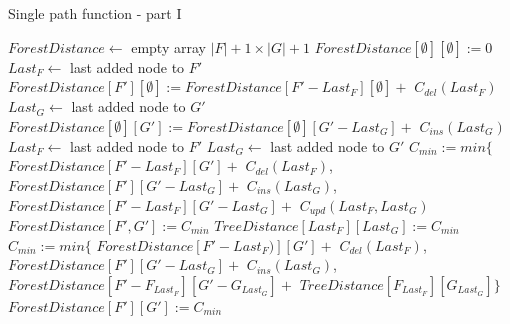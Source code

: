 \begin{algorithm}
  \caption{Single path function - part I}
  \label{alg:spf}
  \begin{algorithmic}[1]
      \State $ForestDistance \gets$ empty array $|F| + 1 \times |G| + 1$
      \label{alg:spf:init}
      \State $ForestDistance[\emptyset][\emptyset] := 0$
        \State $Last_{F} \gets$ last added node to $F'$
        \State $ForestDistance[F'][\emptyset] := ForestDistance[F' - Last_{F}][\emptyset] +$
        \Indent
          \State $C_{del}(Last_{F})$
        \EndIndent
      \EndFor
        \State $Last_{G} \gets$ last added node to $G'$
        \State $ForestDistance[\emptyset][G'] := ForestDistance[\emptyset][G' - Last_{G}] +$
        \Indent
          \State $C_{ins}(Last_{G})$
        \EndIndent
      \EndFor
          \State $Last_{F} \gets$ last added node to $F'$
          \State $Last_{G} \gets$ last added node to $G'$
          \label{alg:spf:iftrees}
            \State $C_{min} := min \{$
            \Indent
            \State $ForestDistance[F' - Last_{F}][G'] +$
              \Indent
                \State $C_{del}(Last_{F})$,
              \EndIndent
              \State $ForestDistance[F'][G' - Last_{G}] +$
              \Indent
                \State $C_{ins}(Last_{G})$,
              \EndIndent
              \State $ForestDistance[F' - Last_{F}][G' - Last_{G}] +$
              \Indent
                \State $C_{upd}(Last_{F}, Last_{G})$
              \EndIndent
            \EndIndent
            \State $ForestDistance[F', G'] := C_{min}$
            \State $TreeDistance[Last_{F}][Last_{G}] := C_{min}$
          \Else
          \label{alg:spf:ifforests}
            \State $C_{min} := min \{$
            \Indent
              \State $ForestDistance[F' - Last_{F})][G'] +$
              \Indent
                \State $C_{del}(Last_{F})$,
              \EndIndent
              \State $ForestDistance[F'][G' - Last_{G}] +$
              \Indent
                \State $C_{ins}(Last_{G})$,
              \EndIndent
              \State $ForestDistance[F' - F_{Last_{F}}][G' - G_{Last_{G}}] +$
              \Indent
                \State $TreeDistance[F_{Last_{F}}][G_{Last_{G}}]\}$
              \EndIndent
            \EndIndent
            \State $ForestDistance[F'][G'] := C_{min}$
          \EndIf
        \EndFor
      \EndFor
    \EndProcedure
  \end{algorithmic}
\end{algorithm}

